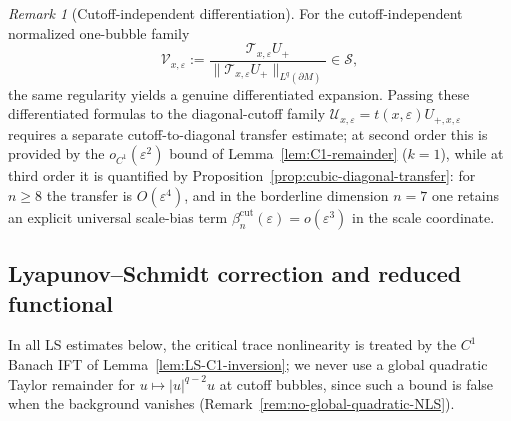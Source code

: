 \documentclass[11pt,reqno,a4paper]{amsart}
\numberwithin{equation}{section}
\theoremstyle{plain}
\theoremstyle{remark}
\newtheorem{remark}[theorem]{Remark}
\theoremstyle{plain}
\begin{document}
\begin{remark}[Cutoff-independent differentiation]
For the cutoff-independent normalized one-bubble family
\[
\mathcal V_{x,\varepsilon}
:=\frac{\mathcal T_{x,\varepsilon}U_+}
{\|\mathcal T_{x,\varepsilon}U_+\|_{L^q(\partial M)}}
\in\mathcal S,
\]
the same regularity yields a genuine differentiated expansion.
Passing these differentiated formulas to the diagonal-cutoff family
$\mathcal U_{x,\varepsilon}=t(x,\varepsilon)U_{+,x,\varepsilon}$
requires a separate cutoff-to-diagonal transfer estimate;
at second order this is provided by the $o_{C^1}(\varepsilon^2)$ bound
of Lemma~\ref{lem:C1-remainder} ($k=1$), while at third order
it is quantified by Proposition~\ref{prop:cubic-diagonal-transfer}:
for $n\ge8$ the transfer is $O(\varepsilon^4)$, and in the borderline
dimension $n=7$ one retains an explicit universal scale-bias term
$\beta_n^{\mathrm{cut}}(\varepsilon)=o(\varepsilon^3)$ in the scale coordinate.
\end{remark}


\subsection{Lyapunov--Schmidt correction and reduced functional}

In all LS estimates below, the critical trace nonlinearity is treated by the
$C^1$ Banach IFT of Lemma~\ref{lem:LS-C1-inversion}; we never use a global
quadratic Taylor remainder for $u\mapsto |u|^{q-2}u$ at cutoff bubbles, since
such a bound is false when the background vanishes
(Remark~\ref{rem:no-global-quadratic-NLS}).
\end{document}
